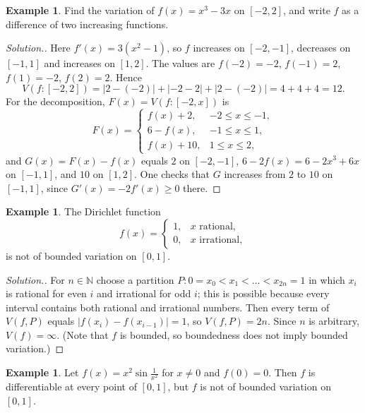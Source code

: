 \documentclass[11pt,a4paper]{article}
\numberwithin{equation}{section}
\theoremstyle{definition}
\newtheorem{exa}[thm]{Example}
\newenvironment{solution}
  {\renewcommand{\qedsymbol}{}\begin{proof}[\textit{Solution}.]}
  {\end{proof}}
\begin{document}
\begin{exa}
Find the variation of $f(x) = x^3 - 3x$ on $[-2,2]$, and write $f$ as a difference of two increasing functions.
\end{exa}

\begin{solution}
Here $f'(x) = 3(x^2 - 1)$, so $f$ increases on $[-2,-1]$, decreases on $[-1,1]$ and increases on $[1,2]$. The values are $f(-2) = -2$, $f(-1) = 2$, $f(1) = -2$, $f(2) = 2$. Hence
$$V(f:[-2,2]) = |2-(-2)| + |-2 - 2| + |2 - (-2)| = 4 + 4 + 4 = 12 .$$
For the decomposition, $F(x) = V(f:[-2,x])$ is
$$F(x) = \begin{cases}
f(x) + 2, & -2\leq x\leq -1,\\
6 - f(x), & -1\leq x\leq 1,\\
f(x) + 10, & 1\leq x\leq 2,
\end{cases}$$
and $G(x) = F(x) - f(x)$ equals $2$ on $[-2,-1]$, $6 - 2f(x) = 6 - 2x^3 + 6x$ on $[-1,1]$, and $10$ on $[1,2]$. One checks that $G$ increases from $2$ to $10$ on $[-1,1]$, since $G'(x) = -2f'(x)\geq 0$ there.
\end{solution}


\begin{exa}
The Dirichlet function
$$f(x) = \begin{cases}
1, & x \text{ rational},\\
0, & x \text{ irrational},
\end{cases}$$
is not of bounded variation on $[0,1]$.
\end{exa}

\begin{solution}
For $n\in\mathbb{N}$ choose a partition $P: 0 = x_0 < x_1 < \dots < x_{2n} = 1$ in which $x_i$ is rational for even $i$ and irrational for odd $i$; this is possible because every interval contains both rational and irrational numbers. Then every term of $V(f,P)$ equals $|f(x_i) - f(x_{i-1})| = 1$, so $V(f,P) = 2n$. Since $n$ is arbitrary, $V(f) = \infty$. (Note that $f$ is bounded, so boundedness does not imply bounded variation.)
\end{solution}


\begin{exa}
Let $f(x) = x^2\sin\frac{1}{x^2}$ for $x\neq 0$ and $f(0) = 0$. Then $f$ is differentiable at every point of $[0,1]$, but $f$ is not of bounded variation on $[0,1]$.
\end{exa}
\end{document}
